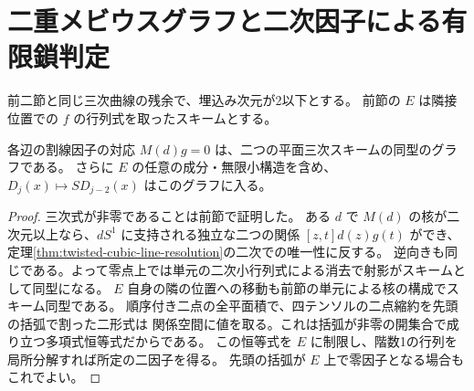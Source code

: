 \section{二重メビウスグラフと二次因子による有限鎖判定}
\label{sec:doubled-binary-pencils}
前二節と同じ三次曲線の残余で、埋込み次元が2以下とする。
前節の $E$ は隣接位置での $f$ の行列式を取ったスキームとする。
\begin{lemma}\label{lem:cubic-secant-isomorphism}
各辺の割線因子の対応 $M(d)g=0$ は、二つの平面三次スキームの同型のグラフである。
さらに $E$ の任意の成分・無限小構造を含め、$D_j(x)\mapsto S D_{j-2}(x)$ はこのグラフに入る。
\end{lemma}
\begin{proof}
三次式が非零であることは前節で証明した。
ある $d$ で $M(d)$ の核が二次元以上なら、$d S^1$ に支持される独立な二つの関係
$[z,t]d(z)g(t)$ ができ、定理\ref{thm:twisted-cubic-line-resolution}の二次での唯一性に反する。
逆向きも同じである。よって零点上では単元の二次小行列式による消去で射影がスキームとして同型になる。
$E$ 自身の隣の位置への移動も前節の単元による核の構成でスキーム同型である。
順序付き二点の全平面積で、四テンソルの二点縮約を先頭の括弧で割った二形式は
関係空間に値を取る。これは括弧が非零の開集合で成り立つ多項式恒等式だからである。
この恒等式を $E$ に制限し、階数1の行列を局所分解すれば所定の二因子を得る。
先頭の括弧が $E$ 上で零因子となる場合もこれでよい。
\end{proof}


